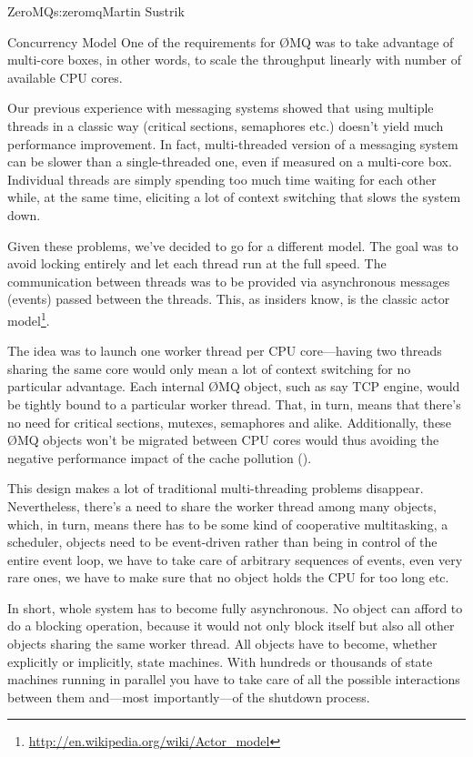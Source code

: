\begin{aosachapter}{ZeroMQ}{s:zeromq}{Martin Sustrik}
\begin{aosasect1}{Concurrency Model}
One of the requirements for ØMQ was to take advantage of multi-core
boxes, in other words, to scale the throughput linearly with number of
available CPU cores.

Our previous experience with messaging systems showed that using
multiple threads in a classic way (critical sections, semaphores etc.)
doesn't yield much performance improvement. In fact, multi-threaded
version of a messaging system can be slower than a single-threaded
one, even if measured on a multi-core box. Individual threads are
simply spending too much time waiting for each other while, at the
same time, eliciting a lot of context switching that slows the system
down.

Given these problems, we've decided to go for a different model. The
goal was to avoid locking entirely and let each thread run at the full
speed. The communication between threads was to be provided via
asynchronous messages (events) passed between the threads. This, as
insiders know, is the classic actor
model\footnote{\url{http://en.wikipedia.org/wiki/Actor\_model}}.

The idea was to launch one worker thread per CPU core---having two
threads sharing the same core would only mean a lot of context
switching for no particular advantage. Each internal ØMQ object, such
as say TCP engine, would be tightly bound to a particular worker
thread. That, in turn, means that there's no need for critical
sections, mutexes, semaphores and alike. Additionally, these ØMQ
objects won't be migrated between CPU cores would thus avoiding the
negative performance impact of the cache pollution
().


This design makes a lot of traditional multi-threading problems
disappear. Nevertheless, there's a need to share the worker thread
among many objects, which, in turn, means there has to be some kind of
cooperative multitasking, a scheduler, objects need to be event-driven
rather than being in control of the entire event loop, we have to take
care of arbitrary sequences of events, even very rare ones, we have to
make sure that no object holds the CPU for too long etc.

In short, whole system has to become fully asynchronous. No object can
afford to do a blocking operation, because it would not only block
itself but also all other objects sharing the same worker thread. All
objects have to become, whether explicitly or implicitly, state
machines. With hundreds or thousands of state machines running in
parallel you have to take care of all the possible interactions
between them and---most importantly---of the shutdown process.


\end{aosasect1}
\end{aosachapter}
